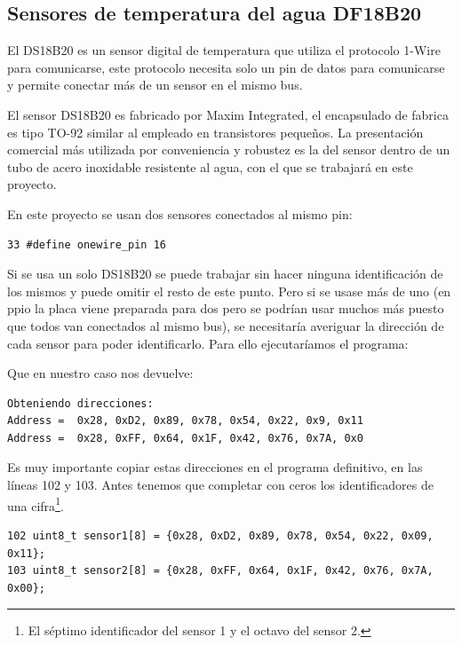 
\subsection{Sensores de temperatura del agua DF18B20}

El DS18B20 es un sensor digital de temperatura que utiliza el protocolo 1-Wire para comunicarse, este protocolo necesita solo un pin de datos para comunicarse y permite conectar más de un sensor en el mismo bus.

El sensor DS18B20 es fabricado por Maxim Integrated, el encapsulado de fabrica es tipo TO-92 similar al empleado en transistores pequeños. La presentación comercial más utilizada por conveniencia y robustez es la del sensor dentro de un tubo de acero inoxidable resistente al agua, con el que se trabajará en este proyecto.

En este proyecto se usan dos sensores conectados al mismo pin: 
\begin{verbatim}
33 #define onewire_pin 16               
\end{verbatim}
Si se usa un solo DS18B20 se puede trabajar sin hacer ninguna identificación de los mismos y puede omitir el resto de este punto. Pero si se usase más de uno (en ppio la placa viene preparada para dos pero se podrían usar muchos más puesto que todos van conectados al mismo bus), se necesitaría averiguar la dirección de cada sensor para poder identificarlo. Para ello ejecutaríamos el programa:



Que en nuestro caso nos devuelve:
\begin{verbatim}
Obteniendo direcciones:
Address =  0x28, 0xD2, 0x89, 0x78, 0x54, 0x22, 0x9, 0x11
Address =  0x28, 0xFF, 0x64, 0x1F, 0x42, 0x76, 0x7A, 0x0
\end{verbatim}

Es muy importante copiar estas direcciones en el programa definitivo, en las líneas 102 y 103. Antes tenemos que completar con ceros los identificadores de una cifra\footnote{El séptimo identificador del sensor 1 y el octavo del sensor 2.}.

\begin{verbatim}
102 uint8_t sensor1[8] = {0x28, 0xD2, 0x89, 0x78, 0x54, 0x22, 0x09, 0x11};
103 uint8_t sensor2[8] = {0x28, 0xFF, 0x64, 0x1F, 0x42, 0x76, 0x7A, 0x00};
\end{verbatim}

